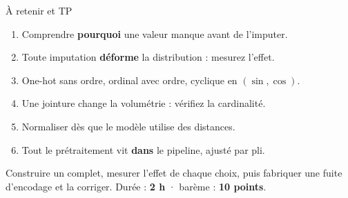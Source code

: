 \begin{frame}{À retenir et TP}
\begin{kbox}
\begin{enumerate}
  \item Comprendre \textbf{pourquoi} une valeur manque avant de l'imputer.
  \item Toute imputation \textbf{déforme} la distribution : mesurez l'effet.
  \item One-hot sans ordre, ordinal avec ordre, cyclique en $(\sin,\cos)$.
  \item Une jointure change la volumétrie : vérifiez la cardinalité.
  \item Normaliser dès que le modèle utilise des distances.
  \item Tout le prétraitement vit \textbf{dans} le pipeline, ajusté par pli.
\end{enumerate}
\end{kbox}
\vspace{1.5mm}
\begin{abox}
Construire un  complet, mesurer l'effet de chaque choix,
puis fabriquer une fuite d'encodage et la corriger.
Durée : \textbf{2 h} · barème : \textbf{10 points}.
\end{abox}
\end{frame}

